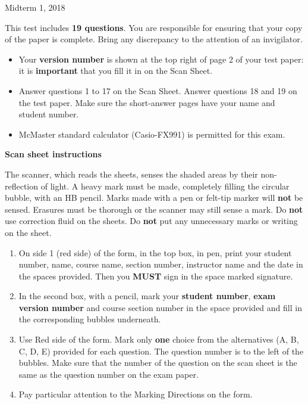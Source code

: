 \documentclass[12pt]{article}
\begin{document}
{ \par}
{\centering Midterm 1, 2018 \par}

\parindent0pt

\vfill

This test includes {\bf 19 questions}. You are responsible for ensuring that your copy of the paper is complete. Bring any discrepancy to the attention of an invigilator. 

\vfill

\begin{itemize}
\item Your \textbf{version number} is shown at the top right of page 2 of your test paper: it is \textbf{important} that you fill it in on the Scan Sheet.
\item Answer questions 1 to 17 on the Scan Sheet. Answer questions 18 and 19 on the test paper. Make sure the short-answer pages have your name and student number.
\item McMaster standard calculator (Casio-FX991) is permitted for this exam.
\end{itemize}

\vfill

\textbf{Scan sheet instructions}

\small{
The scanner, which reads the sheets, senses the shaded areas by their non-reflection of light. A heavy mark must be made, completely filling the circular bubble, with an HB pencil. Marks made with a pen or felt-tip marker will \textbf{not} be sensed. Erasures must be thorough or the scanner may still sense a mark. Do \textbf{not} use correction fluid on the sheets. Do \textbf{not} put any unnecessary marks or writing on the sheet.

\begin{enumerate}
\item On side 1 (red side) of the form, in the top box, in pen, print your student number, name, course name, section number, instructor name and the date in the spaces provided. Then you {\bf MUST} sign in the space marked signature.

\item In the second box, with a pencil, mark your {\bf student number}, {\bf exam version number} and course section number in the space provided and fill in the corresponding bubbles underneath.

\item Use Red side of the form. Mark only {\bf one} choice from the alternatives (A, B, C, D, E) provided for each question. The question number is to the left of the bubbles. Make sure that the number of the question on the scan sheet is the same as the question number on the exam paper.
\item  Pay particular attention to the Marking Directions on the form.
\end{enumerate}
}

\vfill
{ \par}
\end{document}
